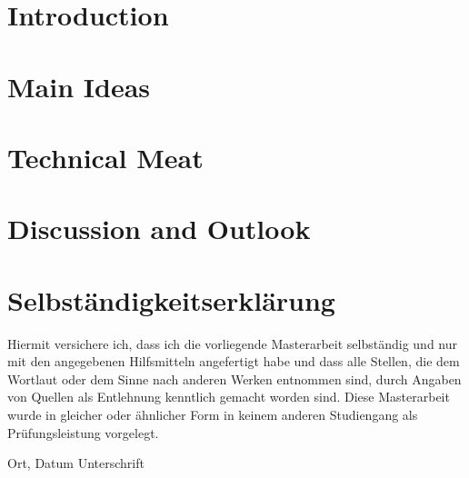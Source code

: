 \documentclass[acmsmall,nonacm,screen]{acmart}
\begin{document}
\setcounter{page}{1}

\section{Introduction}
\label{sec:introduction}


\section{Main Ideas}
\label{sec:mainideas}


\section{Technical Meat}
\label{sec:technical-meat}


\section{Discussion and Outlook}
\label{sec:discussion}


\cleardoublepage



\cleardoublepage
\thispagestyle{empty}
\section*{Selbständigkeitserklärung}

Hiermit versichere ich, dass ich die vorliegende Masterarbeit
selbständig und nur mit den angegebenen Hilfsmitteln angefertigt habe und dass alle Stellen, die dem Wortlaut oder dem
Sinne nach anderen Werken entnommen sind, durch Angaben von Quellen als
Entlehnung kenntlich gemacht worden sind.
Diese Masterarbeit wurde in gleicher oder ähnlicher Form in keinem anderen
Studiengang als Prüfungsleistung vorgelegt.

\vskip 3cm

Ort, Datum	\hfill Unterschrift \hfill
\end{document}
